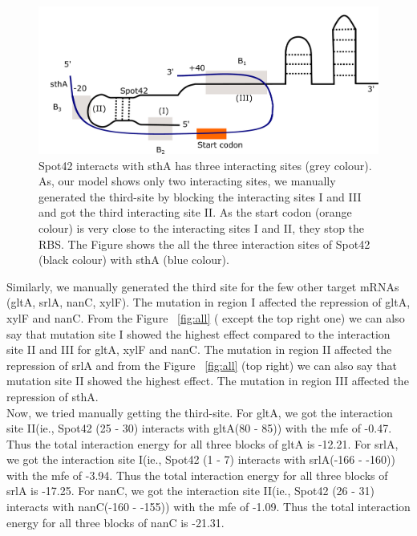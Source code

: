 \documentclass[twoside,a4paper]{report}
\numberwithin{equation}{section}
\begin{document}
	\begin{figure}[h!tb]
	\includegraphics[width=1.0\linewidth]{thirdsite.pdf}
	\centering
	\caption{ Spot42 interacts with sthA has three interacting sites (grey colour). As, our model shows only two interacting sites, we manually generated the third-site by blocking the interacting sites I and III and got the third interacting site II. As the start codon (orange colour) is very close to the interacting sites I and II, they stop the RBS. The Figure shows the all the three interaction sites of Spot42 (black colour) with sthA (blue colour).  } 
	\label{fig:thirdsite}
\end{figure}

Similarly, we manually generated the third site for the few other target mRNAs (gltA, srlA, nanC, xylF). The mutation in region I affected the repression of gltA, xylF and nanC. From the Figure ~\ref{fig:all} ( except the top right one) we can also say that mutation site I showed the highest effect compared to the interaction site II and III for gltA, xylF and nanC. The mutation in region II affected the repression of srlA and from the Figure ~\ref{fig:all} (top right) we can also say that mutation site II showed the highest effect. The mutation in region III affected the repression of sthA. \\

 Now, we tried manually getting the third-site. For gltA, we got the interaction site II(ie., Spot42 (25 - 30) interacts with gltA(80 - 85)) with the mfe of -0.47. Thus the total interaction energy for all three blocks of gltA is -12.21.  For srlA, we got the interaction site I(ie., Spot42 (1 - 7) interacts with srlA(-166 - -160)) with the mfe of -3.94. Thus the total interaction energy for all three blocks of srlA is -17.25. For nanC, we got the interaction site II(ie., Spot42 (26 - 31) interacts with nanC(-160 - -155)) with the mfe of -1.09. Thus the total interaction energy for all three blocks of nanC is -21.31.\\
\end{document}
